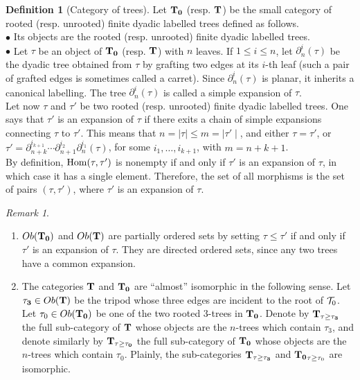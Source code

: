 \documentclass[twoside]{irmaems}
\theoremstyle{plain}
\theoremstyle{definition}
\newtheorem{definition}{Definition}[section]
\theoremstyle{remark}
\newtheorem{remark}[theorem]{Remark}
\begin{document}
\begin{definition}[Category of trees]

 Let $\bf T_0$ (resp. $\bf T$) be the small category of rooted (resp. unrooted) finite dyadic labelled trees defined as follows.\\
\indent $\bullet$ Its objects are the rooted (resp. unrooted) finite dyadic labelled trees.\\
\indent $\bullet$ Let $\tau$ be an object of $\bf T_0$ (resp. $\bf T$) with $n$ leaves.  If $1\leq i\leq n$,
 let $\partial^{i}_{n}(\tau)$ be the dyadic tree obtained from $\tau$ by grafting two edges at its $i$-th leaf (such a pair of grafted edges is
 sometimes called a carret). Since $\partial^{i}_{n}(\tau)$ is planar, it inherits a canonical labelling.
 The tree $\partial^{i}_{n}(\tau)$ is called a simple expansion of $\tau$.\\
  Let now $\tau$ and $\tau'$ be two rooted (resp. unrooted) finite dyadic labelled trees. One says that $\tau'$ is an expansion of $\tau$ if  there exits a chain of
  simple expansions connecting $\tau$ to $\tau'$. This means that $n=\mid \tau\mid \leq m=\mid \tau' \mid$, and either $\tau=\tau'$, or
$\tau'=\partial^{i_{k+1}}_{n+k}\cdots \partial^{i_2}_{n+1} \partial^{i_1}_{n}(\tau)$, for some $i_{1},\ldots, i_{k+1}$,  with $m=n+k+1$.\\
By definition,  ${\rm Hom}(\tau,\tau')$ is nonempty if and only if $\tau'$ is an expansion of $\tau$, in which case it has a single element. Therefore, the set
of all morphisms is the set of pairs $(\tau,\tau')$, where $\tau'$ is an expansion of $\tau$.



\end{definition}


\begin{remark}\label{presque}

\begin{enumerate}

\item $Ob(\bf T_0)$ and $Ob(\bf T)$ are partially ordered sets by setting $\tau\leq \tau'$ if and only if $\tau'$ is an expansion of $\tau$. They are directed ordered sets, since any two trees have a 
common expansion.

\item The categories $\bf T$ and $\bf T_0$ are ``almost'' isomorphic in the following sense. Let ${\bf \tau_3}\in Ob({\bf T})$ be the tripod
 whose three edges are incident to the root of ${\cal T}_0$. Let $\tau_0\in Ob({\bf T_0})$ be one of the two rooted 3-trees in $\bf T_{0}$. Denote by $\bf T_{\tau\geq \tau_3 }$ the full sub-category of $\bf T$ whose objects are the $n$-trees which contain $\tau_3$, and denote similarly by $\bf T_{\tau\geq \tau_0 }$ the full sub-category of $\bf T_0$ whose objects are the $n$-trees which contain $\tau_0$. Plainly, the sub-categories $\bf T_{\tau\geq \tau_3 }$ and ${\bf T_0}_{\tau\geq \tau_0 }$ are isomorphic.
\end{enumerate}

\end{remark}
\end{document}
